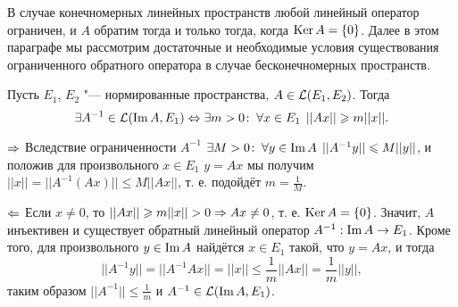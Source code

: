 \documentclass[main]{subfiles}
\begin{document}
В случае конечномерных линейных пространств
любой линейный оператор ограничен,
и \( A \) обратим тогда и только тогда,
когда \( \operatorname{Ker} A = \{ 0 \} \).
Далее в этом параграфе мы рассмотрим
достаточные и необходимые условия
существования ограниченного обратного оператора
в случае бесконечномерных пространств.

\begin{theorem}
  Пусть \( E_1 \), \( E_2 \) "---
  нормированные пространства,
  \( A \in \Linears{E_1}[E_2] \).
  Тогда
  \[
    \exists A^{-1} \in \Linears{\Img A}[E_1] \oTTo
    \Exists{m > 0} \Forall{x \in E_1} ||Ax|| \ge m ||x||.
  \]
\end{theorem}
\begin{itemproof}
\item [\( \Rightarrow \)]
  Вследствие ограниченности \( A^{-1} \)
  \( \exists M > 0 \colon \: \forall {y \in \operatorname{Im}A} \; \, ||A^{-1} y|| \leqslant M||y|| \),
  и положив для произвольного \( x \in E_1 \) \( y = Ax \)
  мы получим \( ||x|| = ||A^{-1} (A x)|| \le M ||Ax|| \),
  т. е. подойдёт \( m = \frac{1}{M} \).
\item[\( \Leftarrow \)] %
  Если \( x \ne 0 \), то \( ||Ax|| \geqslant m ||x|| > 0 \Rightarrow Ax \ne 0 \),
  т. е. \( \operatorname{Ker} A = \{ 0 \} \).
  Значит, \( A \) инъективен и существует
  обратный линейный оператор \( A^{-1} : \operatorname{Im} A \to E_1 \).
  Кроме того, для произвольного \( y \in \operatorname{Im} A \)
  найдётся \( x \in E_1 \) такой, что \( y = Ax \),
  и тогда
  \[
    ||A^{-1} y|| = ||A^{-1} A x|| = ||x|| \le
    \frac{1}{m} ||Ax|| = \frac1m ||y||,
  \]
  таким образом \( ||A^{-1}|| \le \frac{1}{m} \)
  и \( A^{-1} \in \Linears{\Img A}[E_1] \).
\end{itemproof}
\end{document}
